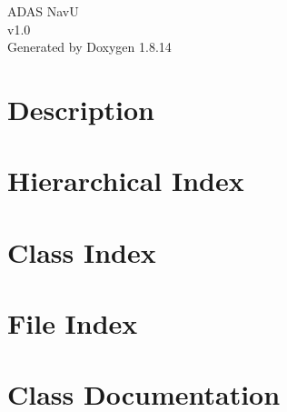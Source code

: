 \documentclass[twoside]{book}
\newcommand{\+}{\discretionary{\mbox{\scriptsize$\hookleftarrow$}}{}{}}
\newcommand{\clearemptydoublepage}{%
  \newpage{\pagestyle{empty}\cleardoublepage}%
}
\begin{document}
\hypersetup{pageanchor=false,
             bookmarksnumbered=true,
             pdfencoding=unicode
            }
\begin{titlepage}
\vspace*{7cm}
\begin{center}%
{\Large A\+D\+AS NavU \\[1ex]\large v1.\+0 }\\
\vspace*{1cm}
{\large Generated by Doxygen 1.8.14}\\
\end{center}
\end{titlepage}
\clearemptydoublepage
{}
\tableofcontents
\clearemptydoublepage
{}
\hypersetup{pageanchor=true}

\chapter{Description}
\label{index}\hypertarget{index}{}
\chapter{Hierarchical Index}

\chapter{Class Index}

\chapter{File Index}

\chapter{Class Documentation}















\end{document}
